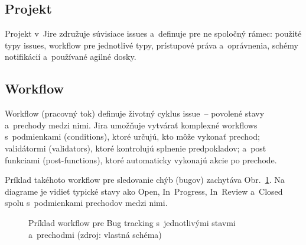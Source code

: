 \subsection{Projekt}

Projekt v~Jire združuje súvisiace issues a~definuje pre ne spoločný rámec: použité typy issues, workflow pre jednotlivé typy, prístupové práva a~oprávnenia, schémy notifikácií a~používané agilné dosky.

\subsection{Workflow}

Workflow (pracovný tok) definuje životný cyklus issue~-- povolené stavy a~prechody medzi nimi. Jira umožňuje vytvárať komplexné workflows s~podmienkami (conditions), ktoré určujú, kto môže vykonať prechod; validátormi (validators), ktoré kontrolujú splnenie predpokladov; a~post funkciami (post-functions), ktoré automaticky vykonajú akcie po prechode.

Príklad takéhoto workflow pre sledovanie chýb (bugov) zachytáva Obr.~\ref{fig:workflow}. Na diagrame je vidieť typické stavy ako Open, In~Progress, In~Review a~Closed spolu s~podmienkami prechodov medzi nimi.

\begin{figure}[ht]
\centering
{}
\caption{Príklad workflow pre Bug tracking s~jednotlivými stavmi a~prechodmi (zdroj: vlastná schéma)}
\label{fig:workflow}
\end{figure}

